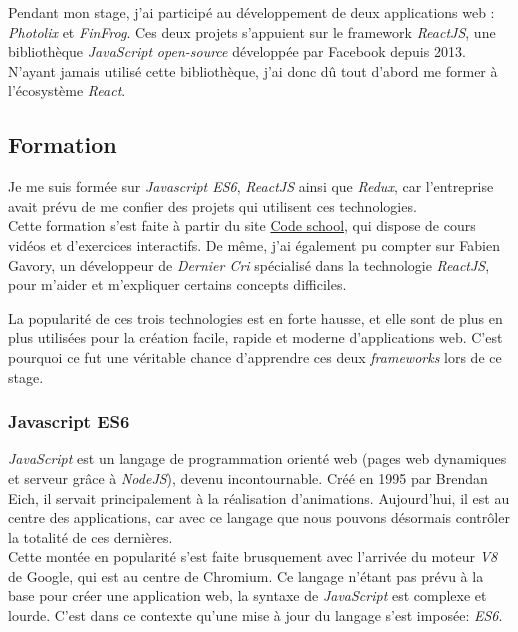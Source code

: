 \documentclass[12pt,a4paper]{article}
\begin{document}
  \bigskip

  Pendant mon stage, j'ai participé au développement de deux applications
  web : \emph{Photolix} et \emph{FinFrog}. Ces deux projets s'appuient sur
  le framework \emph{ReactJS}, une bibliothèque \emph{JavaScript}
  \emph{open-source} développée par Facebook depuis 2013. N'ayant jamais
  utilisé cette bibliothèque, j'ai donc dû tout d'abord me former à
  l'écosystème \emph{React}.

  \bigskip

  \subsection{Formation}\label{formation}

  \bigskip

  Je me suis formée sur \emph{Javascript ES6}, \emph{ReactJS} ainsi que
  \emph{Redux}, car l'entreprise avait prévu de me confier des projets qui
  utilisent ces technologies.\\
  Cette formation s'est faite à partir du site
  \href{https://www.codeschool.com/}{Code school}, qui dispose de cours
  vidéos et d'exercices interactifs. De même, j'ai également pu compter
  sur Fabien Gavory, un développeur de \emph{Dernier Cri} spécialisé dans
  la technologie \emph{ReactJS}, pour m'aider et m'expliquer certains
  concepts difficiles.

  \bigskip

  La popularité de ces trois technologies est en forte hausse, et elle
  sont de plus en plus utilisées pour la création facile, rapide et
  moderne d'applications web. C'est pourquoi ce fut une véritable chance
  d'apprendre ces deux \emph{frameworks} lors de ce stage.

  \bigskip

  \subsubsection{Javascript ES6}\label{javascript-es6}

  \bigskip

  \emph{JavaScript} est un langage de programmation orienté web (pages web
  dynamiques et serveur grâce à \emph{NodeJS}), devenu incontournable.
  Créé en 1995 par Brendan Eich, il servait principalement à la
  réalisation d'animations. Aujourd'hui, il est au centre des
  applications, car avec ce langage que nous pouvons désormais contrôler
  la totalité de ces dernières.\\
  Cette montée en popularité s'est faite brusquement avec l'arrivée du
  moteur \emph{V8} de Google, qui est au centre de Chromium. Ce langage
  n'étant pas prévu à la base pour créer une application web, la syntaxe
  de \emph{JavaScript} est complexe et lourde. C'est dans ce contexte
  qu'une mise à jour du langage s'est imposée: \emph{ES6}.
\end{document}
